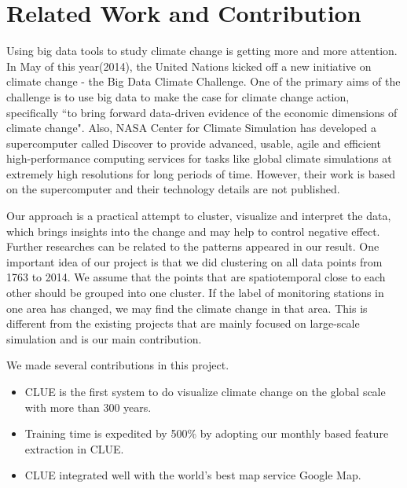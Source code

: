 \section{Related Work and Contribution}
Using big data tools to study climate change is getting more and more attention. In May of this year(2014), the United Nations kicked off a new initiative on climate change - the Big Data Climate Challenge\cite{climatechallenge}. One of the primary aims of the challenge is to use big data to make the case for climate change action, specifically ``to bring forward data-driven evidence of the economic dimensions of climate change". Also, NASA Center for Climate Simulation has developed a supercomputer called Discover to provide advanced, usable, agile and efficient high-performance computing services for tasks like global climate simulations at extremely high resolutions for long periods of time\cite{nasa}. However, their work is based on the supercomputer and their technology details are not published. 

Our approach is a practical attempt to cluster, visualize and interpret the data, which brings insights into the change and may help to control negative effect. Further researches can be related to the patterns appeared in our result. One important idea of our project is that we did clustering on all data points from 1763 to 2014. We assume that the points that are spatiotemporal close to each other should be grouped into one cluster. If the label of monitoring stations in one area has changed, we may find the climate change in that area. This is different from the existing projects that are mainly focused on large-scale simulation and is our main contribution. 

We made several contributions in this project.
\begin{itemize}
    \item CLUE is the first system to do visualize climate change on the global scale with more than 300 years.
    \item Training time is expedited by 500\% by adopting our monthly based feature extraction in CLUE.
    \item CLUE integrated well with the world's best map service Google Map.
\end{itemize}
